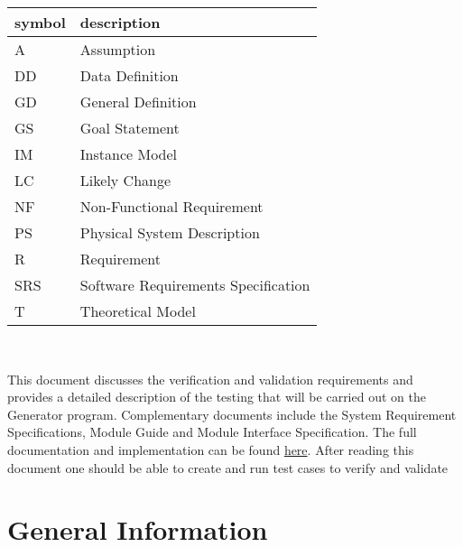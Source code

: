 \documentclass[12pt, titlepage]{article}
\begin{document}
\renewcommand{\arraystretch}{1.2}
\begin{tabular}{l l} 
  \toprule		
  \textbf{symbol} & \textbf{description}\\
  \midrule 
  A & Assumption\\
  DD & Data Definition\\
  GD & General Definition\\
  GS & Goal Statement\\
  IM & Instance Model\\
  LC & Likely Change\\
  NF & Non-Functional Requirement\\
  PS & Physical System Description\\
  R & Requirement\\
  SRS & Software Requirements Specification\\
  T & Theoretical Model\\
  \bottomrule
\end{tabular}\\


\newpage

\tableofcontents

\listoftables


\newpage


This document discusses the verification and validation requirements and
provides a detailed description of the testing that will be carried out on the
\progname {} Generator program.
Complementary documents include the System Requirement Specifications, Module
Guide and Module Interface Specification.  The full documentation and
implementation can be found
\href{https://www.github.com/karolserkis}{here}. 
After reading this document one should be able to create and run test cases to 
verify and validate \progname
{}

\section{General Information}
\end{document}
